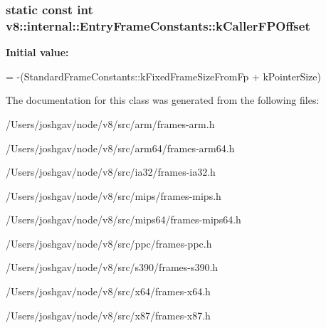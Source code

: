 \subsubsection[{\texorpdfstring{k\+Caller\+F\+P\+Offset}{kCallerFPOffset}}]{\setlength{\rightskip}{0pt plus 5cm}static const int v8\+::internal\+::\+Entry\+Frame\+Constants\+::k\+Caller\+F\+P\+Offset\hspace{0.3cm}{\ttfamily [static]}}\hypertarget{classv8_1_1internal_1_1_entry_frame_constants_a0dc2a8848777a2a9a37914c10c038ef0}{}\label{classv8_1_1internal_1_1_entry_frame_constants_a0dc2a8848777a2a9a37914c10c038ef0}
{\bfseries Initial value\+:}
\begin{DoxyCode}
=
      -(StandardFrameConstants::kFixedFrameSizeFromFp + kPointerSize)
\end{DoxyCode}


The documentation for this class was generated from the following files\+:\begin{DoxyCompactItemize}
\item 
/\+Users/joshgav/node/v8/src/arm/frames-\/arm.\+h\item 
/\+Users/joshgav/node/v8/src/arm64/frames-\/arm64.\+h\item 
/\+Users/joshgav/node/v8/src/ia32/frames-\/ia32.\+h\item 
/\+Users/joshgav/node/v8/src/mips/frames-\/mips.\+h\item 
/\+Users/joshgav/node/v8/src/mips64/frames-\/mips64.\+h\item 
/\+Users/joshgav/node/v8/src/ppc/frames-\/ppc.\+h\item 
/\+Users/joshgav/node/v8/src/s390/frames-\/s390.\+h\item 
/\+Users/joshgav/node/v8/src/x64/frames-\/x64.\+h\item 
/\+Users/joshgav/node/v8/src/x87/frames-\/x87.\+h\end{DoxyCompactItemize}
